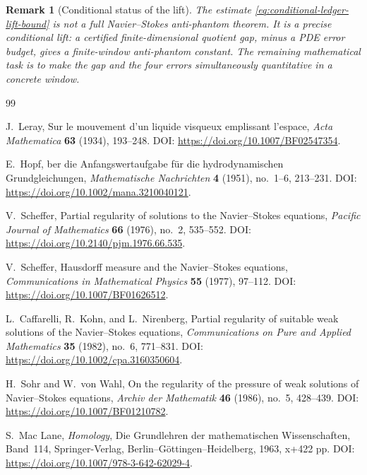 \documentclass[11pt]{article}
\numberwithin{equation}{section}
\newtheorem{remark}[theorem]{Remark}
\begin{document}
\begin{remark}[Conditional status of the lift]
The estimate \eqref{eq:conditional-ledger-lift-bound} is not a full Navier--Stokes anti-phantom theorem.  It is a precise conditional lift: a certified finite-dimensional quotient gap, minus a PDE error budget, gives a finite-window anti-phantom constant.  The remaining mathematical task is to make the gap and the four errors simultaneously quantitative in a concrete window.
\end{remark}



\begin{thebibliography}{99}

J.~Leray,
\newblock Sur le mouvement d'un liquide visqueux emplissant l'espace,
\newblock \emph{Acta Mathematica} \textbf{63} (1934), 193--248.
\newblock DOI: \url{https://doi.org/10.1007/BF02547354}.

E.~Hopf,
ber die Anfangswertaufgabe f{\"u}r die hydrodynamischen Grundgleichungen,
\newblock \emph{Mathematische Nachrichten} \textbf{4} (1951), no.~1--6, 213--231.
\newblock DOI: \url{https://doi.org/10.1002/mana.3210040121}.

V.~Scheffer,
\newblock Partial regularity of solutions to the Navier--Stokes equations,
\newblock \emph{Pacific Journal of Mathematics} \textbf{66} (1976), no.~2, 535--552.
\newblock DOI: \url{https://doi.org/10.2140/pjm.1976.66.535}.

V.~Scheffer,
\newblock Hausdorff measure and the Navier--Stokes equations,
\newblock \emph{Communications in Mathematical Physics} \textbf{55} (1977), 97--112.
\newblock DOI: \url{https://doi.org/10.1007/BF01626512}.

L.~Caffarelli, R.~Kohn, and L.~Nirenberg,
\newblock Partial regularity of suitable weak solutions of the Navier--Stokes equations,
\newblock \emph{Communications on Pure and Applied Mathematics} \textbf{35} (1982), no.~6, 771--831.
\newblock DOI: \url{https://doi.org/10.1002/cpa.3160350604}.

H.~Sohr and W.~von Wahl,
\newblock On the regularity of the pressure of weak solutions of Navier--Stokes equations,
\newblock \emph{Archiv der Mathematik} \textbf{46} (1986), no.~5, 428--439.
\newblock DOI: \url{https://doi.org/10.1007/BF01210782}.

S.~Mac Lane,
\newblock \emph{Homology},
\newblock Die Grundlehren der mathematischen Wissenschaften, Band~114, Springer-Verlag, Berlin--G{\"o}ttingen--Heidelberg, 1963, x+422 pp.
\newblock DOI: \url{https://doi.org/10.1007/978-3-642-62029-4}.


\end{thebibliography}
\end{document}
